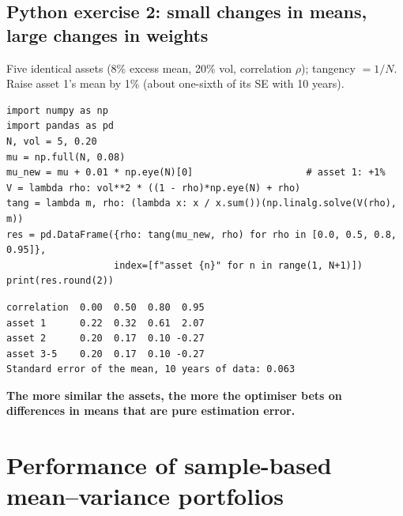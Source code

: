 \documentclass[11pt,a4paper]{report}
\begin{document}
\subsection*{Python exercise 2: small changes in means, large changes in weights}
Five identical assets (8\% excess mean, 20\% vol, correlation $\rho$); tangency $=1/N$.
Raise asset 1's mean by 1\% (about one-sixth of its SE with 10 years).
\begin{lstlisting}
import numpy as np
import pandas as pd
N, vol = 5, 0.20
mu = np.full(N, 0.08)
mu_new = mu + 0.01 * np.eye(N)[0]                    # asset 1: +1%
V = lambda rho: vol**2 * ((1 - rho)*np.eye(N) + rho)
tang = lambda m, rho: (lambda x: x / x.sum())(np.linalg.solve(V(rho), m))
res = pd.DataFrame({rho: tang(mu_new, rho) for rho in [0.0, 0.5, 0.8, 0.95]},
                   index=[f"asset {n}" for n in range(1, N+1)])
print(res.round(2))
\end{lstlisting}
\begin{lstlisting}[style=out]
correlation  0.00  0.50  0.80  0.95
asset 1      0.22  0.32  0.61  2.07
asset 2      0.20  0.17  0.10 -0.27
asset 3-5    0.20  0.17  0.10 -0.27
Standard error of the mean, 10 years of data: 0.063
\end{lstlisting}
\textbf{The more similar the assets, the more the optimiser bets on differences in
means that are pure estimation error.}

\section{Performance of sample-based mean--variance portfolios}
\end{document}
